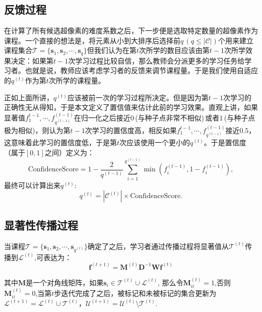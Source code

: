 \subsection{反馈过程}
在计算了所有候选超像素的难度系数之后，下一步便是选取特定数量的超像素作为课程。一个直接的想法是，将元素从小到大排序后选择前$q \,(q\leq |\mathcal{C}|)$个用来建立课程集合$\mathcal{T}=\{\mathbf{s}_1,\mathbf{s}_2,\cdots,\mathbf{s}_q\}$但我们认为在第$t$次所学的数目应该由第$t-1$次所学效果决定：如果第$t-1$次学习过程比较自信，那么教师会分派更多的学习任务给学习者。也就是说，教师应该考虑学习者的反馈来调节课程量。于是我们使用自适应的$q^{(t)}$作为第$t$次所学的课程量。

正如上面所讲，$q^{(t)}$应该被前一次的学习过程所决定。但是因为第$t-1$次学习的正确性无从得知，于是本文定义了置信值来估计此前的学习效果。直观上讲，如果显著值$f_1^{t-1},\cdots, f_{q^{(t-1)}}^{(t-1)}$在归一化之后接近$0$\,(与种子点非常不相似)\,或者$1$\,(与种子点极为相似)，则认为第$t-1$次学习的置信度高，相反如果$f_1^{t-1},\cdots, f_{q^{(t-1)}}^{(t-1)}$接近$0.5$，这意味着此学习的置信度低，于是第$t$次应该使用一个更小的$q^{(t)}$。于是置信度（属于$[0,1]$之间）定义为：
\begin{equation}
\label{eq:12}
\mathrm{ConfidenceScore}=1-\frac{2}{q^{(t-1)}}\sum_{i=1}^{q^{(t-1)}}\min{(f_i^{(t-1)},1-f_i^{(t-1)})}, 
\end{equation}
最终可以计算出来$q^{(t)}$:
\begin{equation}
\label{eq:13}
q^{(t)}={|\mathcal{C}^{(t)}|\times \mathrm{ConfidenceScore}}.
\end{equation}

\subsection{显著性传播过程}
当课程$\mathcal{T}=\{\mathbf{s}_1,\mathbf{s}_2,\cdots,\mathbf{s}_{q^{(t)}}\}$确定了之后，学习者通过传播过程将显著值从$\mathcal{T}^{(t)}$传播到$\mathcal{L}^{(t)}$,可表达为：
\begin{equation}
\label{eq:14}
\mathbf{f}^{(t+1)}=\mathbf{M}^{(t)}\mathbf{D}^{-1}\mathbf{W}\mathbf{f}^{(t)}
\end{equation}

其中$\mathbf{M}$是一个对角线矩阵，如果$\mathbf{s}_i\in \mathcal{T}^{(t)}\cup \mathcal{L}^{(t)}$,
那么令$\mathbf{M}_{ii}^{(t)}=1$,否则$\mathbf{M}_{ii}^{(t)}=0$,当第$t$步迭代完成了之后，被标记和未被标记的集合更新为$\mathcal{L}^{(t+1)}=\mathcal{L}^{(t)} \cup \mathcal{T}^{(t)}$，$\mathcal{U}^{(t+1)}=\mathcal{U}^{(t)} \setminus \mathcal{T}^{(t)}$.

